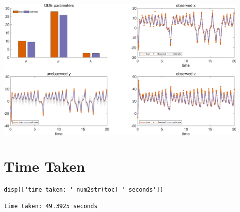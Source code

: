 {\centering
\includegraphics [width=5in]{VGM_for_Lorenz_Attractor_42.eps}

}

\section{Time Taken}

\color{RoyalPurple}\begin{verbatim}
disp(['time taken: ' num2str(toc) ' seconds'])
\end{verbatim} 
\color{black}

        \color{MidnightBlue} \begin{verbatim}time taken: 49.3925 seconds
\end{verbatim} 
\color{black}